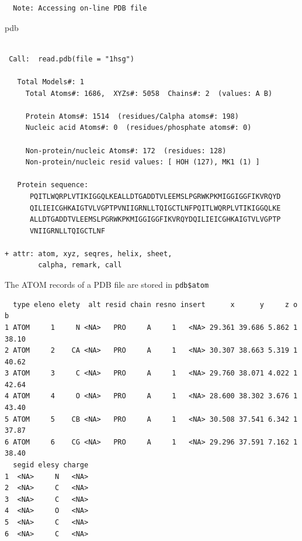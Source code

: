 \documentclass[
  letterpaper,
  DIV=11,
  numbers=noendperiod]{scrartcl}
\newenvironment{Shaded}{\begin{snugshade}}{\end{snugshade}}
\newcommand{\FunctionTok}[1]{\textcolor[rgb]{0.28,0.35,0.67}{#1}}
\newcommand{\NormalTok}[1]{\textcolor[rgb]{0.00,0.23,0.31}{#1}}
\newcommand{\SpecialCharTok}[1]{\textcolor[rgb]{0.37,0.37,0.37}{#1}}
\begin{document}
\begin{verbatim}
  Note: Accessing on-line PDB file
\end{verbatim}

\begin{Shaded}
\begin{Highlighting}[]
\NormalTok{pdb}
\end{Highlighting}
\end{Shaded}

\begin{verbatim}

 Call:  read.pdb(file = "1hsg")

   Total Models#: 1
     Total Atoms#: 1686,  XYZs#: 5058  Chains#: 2  (values: A B)

     Protein Atoms#: 1514  (residues/Calpha atoms#: 198)
     Nucleic acid Atoms#: 0  (residues/phosphate atoms#: 0)

     Non-protein/nucleic Atoms#: 172  (residues: 128)
     Non-protein/nucleic resid values: [ HOH (127), MK1 (1) ]

   Protein sequence:
      PQITLWQRPLVTIKIGGQLKEALLDTGADDTVLEEMSLPGRWKPKMIGGIGGFIKVRQYD
      QILIEICGHKAIGTVLVGPTPVNIIGRNLLTQIGCTLNFPQITLWQRPLVTIKIGGQLKE
      ALLDTGADDTVLEEMSLPGRWKPKMIGGIGGFIKVRQYDQILIEICGHKAIGTVLVGPTP
      VNIIGRNLLTQIGCTLNF

+ attr: atom, xyz, seqres, helix, sheet,
        calpha, remark, call
\end{verbatim}

The ATOM records of a PDB file are stored in \texttt{pdb\$atom}

\begin{Shaded}
\end{Shaded}

\begin{verbatim}
  type eleno elety  alt resid chain resno insert      x      y     z o     b
1 ATOM     1     N <NA>   PRO     A     1   <NA> 29.361 39.686 5.862 1 38.10
2 ATOM     2    CA <NA>   PRO     A     1   <NA> 30.307 38.663 5.319 1 40.62
3 ATOM     3     C <NA>   PRO     A     1   <NA> 29.760 38.071 4.022 1 42.64
4 ATOM     4     O <NA>   PRO     A     1   <NA> 28.600 38.302 3.676 1 43.40
5 ATOM     5    CB <NA>   PRO     A     1   <NA> 30.508 37.541 6.342 1 37.87
6 ATOM     6    CG <NA>   PRO     A     1   <NA> 29.296 37.591 7.162 1 38.40
  segid elesy charge
1  <NA>     N   <NA>
2  <NA>     C   <NA>
3  <NA>     C   <NA>
4  <NA>     O   <NA>
5  <NA>     C   <NA>
6  <NA>     C   <NA>
\end{verbatim}
\end{document}
